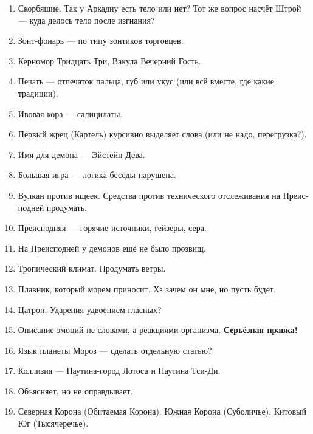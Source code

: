 \documentclass[a4paper,12pt,fleqn]{book}\usepackage{cooltooltips}\usepackage{polyglossia}\setdefaultlanguage[babelshorthands=true]{russian}\setotherlanguage{english}\defaultfontfeatures{Ligatures=TeX,Mapping=tex-text} \usepackage{xcolor}\definecolor{lightgray}{HTML}{bbbbbb}\color{lightgray}\newcommand{\ml}[3]{\textenglish{\textcolor{black}{#3}}}
\begin{document}
{\begin{enumerate}
\item Скорбящие.
Так у Аркадиу есть тело или нет?
Тот же вопрос насчёт Штрой --- куда делось тело после изгнания?

\item Зонт-фонарь --- по типу зонтиков торговцев.

\item Керномор Тридцать Три, Вакула Вечерний Гость.

\item Печать --- отпечаток пальца, губ или укус (или всё вместе, где какие традиции).

\item Ивовая кора --- салицилаты.

\item Первый жрец (Картель) курсивно выделяет слова (или не надо, перегрузка?).

\item Имя для демона --- Эйстейн Дева.

\item Большая игра --- логика беседы нарушена.

\item Вулкан против ищеек.
Средства против технического отслеживания на Преисподней продумать.

\item Преисподняя --- горячие источники, гейзеры, сера.

\item На Преисподней у демонов ещё не было прозвищ.

\item Тропический климат.
Продумать ветры.

\item Плавник, который морем приносит.
Хз зачем он мне, но пусть будет.

\item Цатрон.
Ударения удвоением гласных?

\item Описание эмоций не словами, а реакциями организма.
\textbf{Серьёзная правка!}

\item Язык планеты Мороз --- сделать отдельную статью?

\item Коллизия --- Паутина-город Лотоса и Паутина Тси-Ди.

\item Объясняет, но не оправдывает.

\item Северная Корона (Обитаемая Корона).
Южная Корона (Суболичье).
Китовый Юг (Тысячеречье).


\end{enumerate}}
\end{document}
